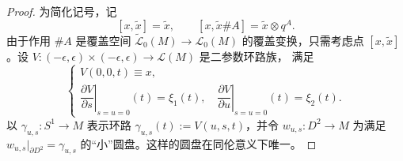 \begin{proof}
为简化记号，记
\[
 [x,\widetilde x]=\widetilde x,\qquad
 [x,\widetilde x\#A]=\widetilde x\otimes q^A.
\]
由于作用 $\#A$ 是覆盖空间
$\widetilde{\mathcal L}_0(M)\to\mathcal L_0(M)$ 的覆盖变换，只需考虑点
$[x,\widetilde x]$。设
$V:(-\epsilon,\epsilon)\times(-\epsilon,\epsilon)\to\mathcal L(M)$ 是二参数环路族，
满足
\[
 \begin{cases}
 V(0,0,t)\equiv x,\\
 \left.\dfrac{\partial V}{\partial s}\right|_{s=u=0}(t)=\xi_1(t),\quad
 \left.\dfrac{\partial V}{\partial u}\right|_{s=u=0}(t)=\xi_2(t).
 \end{cases}
\]
以 $\gamma_{u,s}:S^1\to M$ 表示环路
$\gamma_{u,s}(t):=V(u,s,t)$，并令 $w_{u,s}:D^2\to M$ 为满足
$w_{u,s}|_{\partial D^2}=\gamma_{u,s}$ 的“小”圆盘。这样的圆盘在同伦意义下唯一。


\end{proof}
